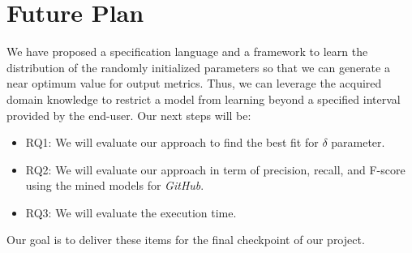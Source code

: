 \section{Future Plan}
\label{sec:future}
We have proposed a specification language and a framework to learn the distribution of the randomly initialized parameters so that we can generate a near optimum value for output metrics. Thus, we can leverage the acquired domain knowledge to restrict a model from learning beyond a specified interval provided by the end-user. Our next steps will be:
\begin{itemize}
	\item RQ1: We will evaluate our approach to find the best fit for $\delta$ parameter.
	\item RQ2: We will evaluate our approach in term of precision, recall, and F-score using the mined models for \emph{GitHub}.
	\item RQ3: We will evaluate the execution time.
\end{itemize}
Our goal is to deliver these items for the final checkpoint of our project.